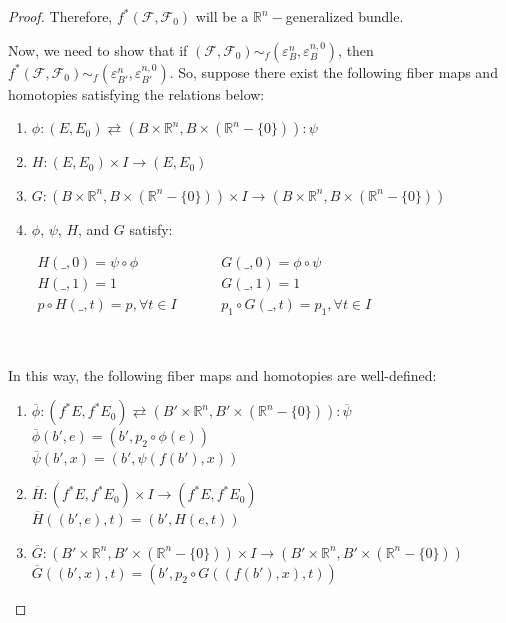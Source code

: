 \documentclass[12pt,oneside]{book}
\newcommand{\R}{\mathbb{R}}
\begin{document}
\begin{proof}
        Therefore, $f^{*}(\mathcal{F},\mathcal{F}_{0})$ will be a $\R^{n}-$generalized bundle.
    
        Now, we need to show that if $(\mathcal{F},\mathcal{F}_{0})\sim_{f}(\varepsilon_{B}^{n},\varepsilon_{B}^{n,0})$, then 
        $f^{*}(\mathcal{F},\mathcal{F}_{0})\sim_{f}(\varepsilon_{B'}^{n},\varepsilon_{B'}^{n,0})$. So, suppose there exist the following 
        fiber maps and homotopies satisfying the relations below:
    
        \begin{enumerate}
            \item $\phi:(E,E_{0})\rightleftarrows(B\times \R^{n},B\times (\R^{n}-\{ 0 \})):\psi$
            \item $H:(E,E_{0})\times I\to (E,E_{0})$
            \item $G:(B\times\R^{n},B\times(\R^{n}-\{ 0 \}))\times I\to (B\times\R^{n},B\times(\R^{n}-\{ 0 \}))$
            \item $\phi$, $\psi$, $H$, and $G$ satisfy:
            
                $\begin{array}{lcccl}
                    H(\_,0)=\psi\circ\phi            & & & & G(\_,0)=\phi\circ\psi \\
                    H(\_,1)=1                        & & & & G(\_,1)=1 \\
                    p\circ H(\_,t)=p, \forall t\in I & & & & p_{1}\circ G(\_,t)=p_{1}, \forall t\in I
                \end{array}$
        \end{enumerate}

        \
    
        In this way, the following fiber maps and homotopies are well-defined:
    
        \begin{enumerate}
            \item $\overline{\phi}:(f^{*}E,f^{*}E_{0})\rightleftarrows (B'\times \R^{n},B'\times (\R^{n}-\{ 0 \})):\overline{\psi}$ \\
            $ \overline{\phi}(b',e)=(b',p_{2}\circ\phi(e)) $ \\
            $ \overline{\psi}(b',x)=(b',\psi(f(b'),x)) $
            \item $\overline{H}:(f^{*}E,f^{*}E_{0})\times I\to (f^{*}E,f^{*}E_{0})$ \\
            $ \overline{H}((b',e),t)=(b',H(e,t)) $
            \item $\overline{G}:(B'\times \R^{n},B'\times (\R^{n}-\{ 0 \}))\times I\to (B'\times \R^{n},B'\times (\R^{n}-\{ 0 \}))$ \\
            $ \overline{G}((b',x),t)=(b',p_{2}\circ G((f(b'),x),t)) $
        \end{enumerate}


\end{proof}
\end{document}
